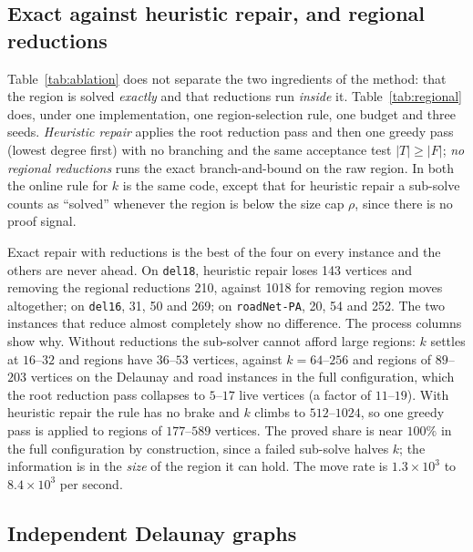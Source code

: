 \documentclass[pdflatex,sn-mathphys-num]{sn-jnl}
\theoremstyle{thmstyleone}%
\theoremstyle{thmstyletwo}%
\begin{document}


\subsection{Exact against heuristic repair, and regional reductions}
\label{sec:regional}

Table~\ref{tab:ablation} does not separate the two ingredients of the method: that the
region is solved \emph{exactly} and that reductions run \emph{inside} it.
Table~\ref{tab:regional} does, under one implementation, one region-selection rule, one
budget and three seeds. \emph{Heuristic repair} applies the root reduction pass and then
one greedy pass (lowest degree first) with no branching and the same acceptance test
$|T|\ge|F|$; \emph{no regional reductions} runs the exact branch-and-bound on the raw
region. In both the online rule for $k$ is the same code, except that for heuristic
repair a sub-solve counts as ``solved'' whenever the region is below the size cap
$\rho$, since there is no proof signal.



Exact repair with reductions is the best of the four on every instance and the others
are never ahead. On \texttt{del18}, heuristic repair loses 143 vertices and removing the
regional reductions 210, against 1018 for removing region moves altogether; on
\texttt{del16}, 31, 50 and 269; on \texttt{roadNet-PA}, 20, 54 and 252. The two
instances that reduce almost completely show no difference. The process columns show
why. Without reductions the sub-solver cannot afford large regions: $k$ settles at
$16$--$32$ and regions have $36$--$53$ vertices, against $k=64$--$256$ and regions of
$89$--$203$ vertices on the Delaunay and road instances in the full configuration, which
the root reduction pass collapses to $5$--$17$ live vertices (a factor of $11$--$19$).
With heuristic repair the rule has no brake and $k$ climbs to $512$--$1024$, so one
greedy pass is applied to regions of $177$--$589$ vertices. The proved share is near
$100\%$ in the full configuration by construction, since a failed sub-solve halves $k$;
the information is in the \emph{size} of the region it can hold. The move rate is
$1.3\times10^3$ to $8.4\times10^3$ per second.

\subsection{Independent Delaunay graphs}
\label{sec:delaunay}
\end{document}
